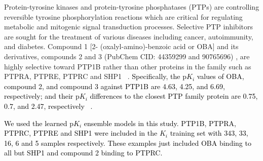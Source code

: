 \documentclass[nocrop]{bioinfo}
\newcommand{\red}[1]{\textcolor{black}{#1}}
\begin{document}
Protein-tyrosine kinases and protein-tyrosine phosphatases  (PTPs) are controlling reversible tyrosine phosphorylation reactions which are critical for regulating metabolic and  mitogenic signal transduction processes. Selective PTP inhibitors are sought for the treatment of various diseases including cancer, autoimmunity, and diabetes. Compound 1 [2- (oxalyl-amino)-benzoic acid or OBA] and its derivatives, compounds 2 and 3  (PubChem CID: 44359299 and 90765696) , are highly selective toward PTP1B rather than other proteins in the family such as PTPRA, PTPRE, PTPRC and SHP1 ~\citep{iversen2000structure}. \red{Specifically, the p$K_i$ values of OBA, compound 2, and compound 3 against PTP1B are 4.63, 4.25, and 6.69, respectively; and their p$K_i$ differences to the closest PTP family protein are 0.75, 0.7, and 2.47, respectively ~\citep{iversen2000structure}.}

\red{We used the learned p$K_i$ ensemble models in this study. PTP1B, PTPRA, PTPRC, PTPRE and SHP1 were included in the $K_i$ training set with 343, 33, 16, 6 and 5 samples respectively. These examples just included OBA binding to all but SHP1 and compound 2 binding to PTPRC.} 
\end{document}
